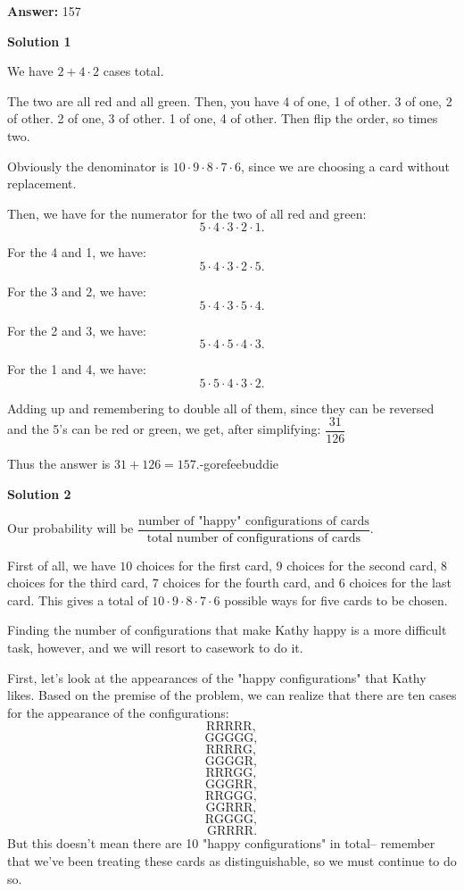 \begin{enumerate}
 
 \textbf{Answer: }157



\textbf{Solution 1}

We have $2+4\cdot 2$ cases total.

 The two are all red and all green. Then, you have 4 of one, 1 of other. 3 of one, 2 of other. 2 of one, 3 of other. 1 of one, 4 of other. Then flip the order, so times two.

 Obviously the denominator is $10\cdot 9\cdot 8\cdot 7\cdot 6$, since we are choosing a card without replacement.

 Then, we have for the numerator for the two of all red and green: 
 \[5\cdot 4\cdot 3\cdot 2\cdot 1.\]

 For the 4 and 1, we have: 
 \[5\cdot 4\cdot 3\cdot 2\cdot 5.\]

 For the 3 and 2, we have: 
 \[5\cdot 4\cdot 3\cdot 5\cdot 4.\]

 For the 2 and 3, we have: 
 \[5\cdot 4\cdot 5\cdot 4\cdot 3.\]

 For the 1 and 4, we have: 
 \[5\cdot 5\cdot 4\cdot 3\cdot 2.\]

 Adding up and remembering to double all of them, since they can be reversed and the 5's can be red or green, we get, after simplifying: $\dfrac{31}{126}$

 Thus the answer is $31 + 126 = \boxed{157}$.-gorefeebuddie

 



\textbf{Solution 2}

Our probability will be $\dfrac{\text{number of "happy" configurations of cards}}{\text{total number of configurations of cards}}.$

 First of all, we have $10$ choices for the first card, $9$ choices for the second card, $8$ choices for the third card, $7$ choices for the fourth card, and $6$ choices for the last card. This gives a total of $10\cdot 9\cdot 8\cdot 7\cdot 6$ possible ways for five cards to be chosen.

 Finding the number of configurations that make Kathy happy is a more difficult task, however, and we will resort to casework to do it.

 First, let's look at the appearances of the "happy configurations" that Kathy likes. Based on the premise of the problem, we can realize that there are ten cases for the appearance of the configurations: 
 \[\text{RRRRR},\] 
 \[\text{GGGGG},\] 
 \[\text{RRRRG},\] 
 \[\text{GGGGR},\] 
 \[\text{RRRGG},\] 
 \[\text{GGGRR},\] 
 \[\text{RRGGG},\] 
 \[\text{GGRRR},\] 
 \[\text{RGGGG},\] 
 \[\text{GRRRR}.\] But this doesn't mean there are 10 "happy configurations" in total-- remember that we've been treating these cards as distinguishable, so we must continue to do so.


\end{enumerate}
